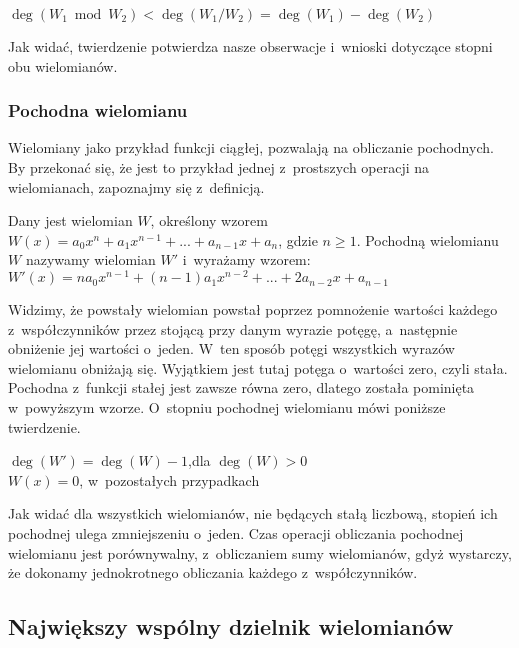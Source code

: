 \begin{theorem}
	$ $\\
	$\deg(W_1 \bmod W_2) < \deg(W_1 / W_2) = \deg(W_1) - \deg(W_2)$
\end{theorem}

Jak widać, twierdzenie potwierdza nasze obserwacje i~wnioski dotyczące stopni obu wielomianów.

\subsubsection{Pochodna wielomianu}

Wielomiany jako przykład funkcji ciągłej, pozwalają na obliczanie pochodnych. By przekonać się, że jest to przykład jednej z~prostszych operacji na wielomianach, zapoznajmy się z~definicją.

\begin{definition}
	$ $\\
	Dany jest wielomian $W$, określony wzorem $W(x) = a_0x^n + a_1x^{n-1} + ... + a_{n-1}x + a_n$, gdzie $n\ge1$. Pochodną wielomianu $W$ nazywamy wielomian $W'$ i~wyrażamy wzorem:
	$W'(x) = na_0x^{n-1} + (n-1)a_1x^{n-2} + ... + 2a_{n-2}x + a_{n-1}$
\end{definition}

Widzimy, że powstały wielomian powstał poprzez pomnożenie wartości każdego z~współczynników przez stojącą przy danym wyrazie potęgę, a~następnie obniżenie jej wartości o~jeden. W~ten sposób potęgi wszystkich wyrazów wielomianu obniżają się. Wyjątkiem jest tutaj potęga o~wartości zero, czyli stała. Pochodna z~funkcji stałej jest zawsze równa zero, dlatego została pominięta w~powyższym wzorze. O~stopniu pochodnej wielomianu mówi poniższe twierdzenie.

\begin{theorem}
	$ $\\
	$\deg(W') = \deg(W) - 1$,dla $\deg(W) > 0$ \\
	$W(x) = 0$, w~pozostałych przypadkach
\end{theorem}

Jak widać dla wszystkich wielomianów, nie będących stałą liczbową, stopień ich pochodnej ulega zmniejszeniu o~jeden. Czas operacji obliczania pochodnej wielomianu jest porównywalny, z~obliczaniem sumy wielomianów, gdyż wystarczy, że dokonamy jednokrotnego obliczania każdego z~współczynników.

\subsection{Największy wspólny dzielnik wielomianów}


